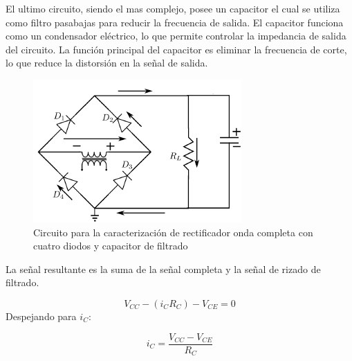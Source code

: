\documentclass[10pt,letterpaper]{article}
\begin{document}
El ultimo circuito, siendo el mas complejo, posee un capacitor el cual 
se utiliza como filtro pasabajas para reducir la frecuencia de salida. El capacitor
funciona como un condensador eléctrico, lo que permite controlar la impedancia de salida
del circuito. La función principal del capacitor es eliminar la frecuencia de corte,
lo que reduce la distorsión en la señal de salida.

\begin{figure}[H]
	\centering
	\includegraphics[scale=1]{OndaCapacitorFiltrado.png}
	\caption{Circuito para la caracterización de rectificador onda completa con cuatro diodos y capacitor de filtrado}
	\label{fig:filtrado}
\end{figure}

La señal resultante es la suma de la señal completa y la señal de rizado de filtrado.

\begin{equation}
	V_{CC}-(i_CR_{C})-V_{CE}=0
\end{equation}
Despejando para $i_C$:

\begin{equation}
	i_C=\frac{ V_{CC}-V_{CE}}{R_{C}}
\end{equation}
\end{document}
